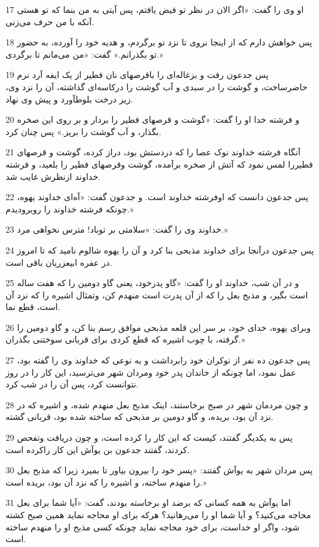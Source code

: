 \par 17 او وی را گفت: «اگر الان در نظر تو فیض یافتم، پس آیتی به من بنما که تو هستی آنکه با من حرف می‌زنی.
\par 18 پس خواهش دارم که از اینجا نروی تا نزد تو برگردم، و هدیه خود را آورده، به حضور تو بگذرانم.» گفت: «من می‌مانم تا برگردی.»
\par 19 پس جدعون رفت و بزغاله‌ای را باقرصهای نان فطیر از یک ایفه آرد نرم حاضرساخت، و گوشت را در سبدی و آب گوشت را درکاسه‌ای گذاشته، آن را نزد وی، زیر درخت بلوطآورد و پیش وی نهاد.
\par 20 و فرشته خدا او را گفت: «گوشت و قرصهای فطیر را بردار و بر روی این صخره بگذار، و آب گوشت را بریز.» پس چنان کرد.
\par 21 آنگاه فرشته خداوند نوک عصا را که دردستش بود، دراز کرده، گوشت و قرصهای فطیررا لمس نمود که آتش از صخره برآمده، گوشت وقرصهای فطیر را بلعید، و فرشته خداوند ازنظرش غایب شد.
\par 22 پس جدعون دانست که اوفرشته خداوند است. و جدعون گفت: «آه‌ای خداوند یهوه، چونکه فرشته خداوند را روبرودیدم.»
\par 23 خداوند وی را گفت: «سلامتی بر توباد! مترس نخواهی مرد.»
\par 24 پس جدعون درآنجا برای خداوند مذبحی بنا کرد و آن را یهوه شالوم نامید که تا امروز در عفره ابیعزریان باقی است.
\par 25 و در آن شب، خداوند او را گفت: «گاو پدرخود، یعنی گاو دومین را که هفت ساله است بگیر، و مذبح بعل را که از آن پدرت است منهدم کن، وتمثال اشیره را که نزد آن است، قطع نما.
\par 26 وبرای یهوه، خدای خود، بر سر این قلعه مذبحی موافق رسم بنا کن، و گاو دومین را گرفته، با چوب اشیره که قطع کردی برای قربانی سوختنی بگذران.»
\par 27 پس جدعون ده نفر از نوکران خود رابرداشت و به نوعی که خداوند وی را گفته بود، عمل نمود، اما چونکه از خاندان پدر خود ومردان شهر می‌ترسید، این کار را در روز نتوانست کرد، پس آن را در شب کرد.
\par 28 و چون مردمان شهر در صبح برخاستند، اینک مذبح بعل منهدم شده، و اشیره که در نزد آن بود، بریده، و گاو دومین بر مذبحی که ساخته شده بود، قربانی گشته.
\par 29 پس به یکدیگر گفتند، کیست که این کار را کرده است، و چون دریافت وتفحص کردند، گفتند جدعون بن یوآش این کار راکرده است.
\par 30 پس مردان شهر به یوآش گفتند: «پسر خود را بیرون بیاور تا بمیرد زیرا که مذبح بعل را منهدم ساخته، و اشیره را که نزد آن بود، بریده است.»
\par 31 اما یوآش به همه کسانی که برضد او برخاسته بودند، گفت: «آیا شما برای بعل محاجه می‌کنید؟ و آیا شما او را می‌رهانید؟ هرکه برای او محاجه نماید همین صبح کشته شود، واگر او خداست، برای خود محاجه نماید چونکه کسی مذبح او را منهدم ساخته است.
